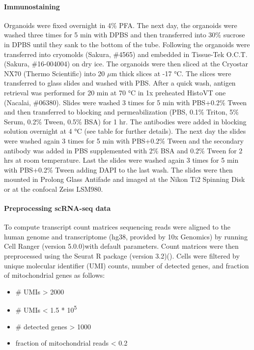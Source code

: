 \paragraph{Immunostaining}
Organoids were fixed overnight in 4\% PFA. The next day, the organoids were washed three times for 5 min with DPBS and then transferred into 30\% sucrose in DPBS until they sank to the bottom of the tube. Following the organoids were transferred into cryomolds (Sakura, \#4565) and embedded in Tissue-Tek O.C.T. (Sakura, \#16-004004) on dry ice. The organoids were then sliced at the Cryostar NX70 (Thermo Scientific) into 20 $\mu$m thick slices at -17 °C. The slices were transferred to glass slides and washed with PBS. After a quick wash, antigen retrieval was performed for 20 min at 70 °C in 1x preheated HistoVT one (Nacalai, \#06380). Slides were washed 3 times for 5 min with PBS+0.2\% Tween and then transferred to blocking and permeabilization (PBS, 0.1\% Triton, 5\% Serum, 0.2\% Tween, 0.5\% BSA) for 1 hr. The antibodies were added in blocking solution overnight at 4 °C (see table for further details). The next day the slides were washed again 3 times for 5 min with PBS+0.2\% Tween and the secondary antibody was added in PBS supplemented with 2\% BSA and 0.2\% Tween for 2 hrs at room temperature. Last the slides were washed again 3 times for 5 min with PBS+0.2\% Tween adding DAPI to the last wash. The slides were then mounted in Prolong Glass Antifade and imaged at the Nikon Ti2 Spinning Disk or at the confocal Zeiss LSM980. 

\paragraph{Preprocessing scRNA-seq data}
To compute transcript count matrices sequencing reads were aligned to the human genome and transcriptome (hg38, provided by 10x Genomics) by running Cell Ranger (version 5.0.0)with default parameters. Count matrices were then preprocessed using the Seurat R package (version 3.2)(\cite{stuart_comprehensive_2019}). Cells were filtered by unique molecular identifier (UMI) counts, number of detected genes, and fraction of mitochondrial genes as follows:

\begin{itemize}
    \item \# UMIs > 2000 
    \item \# UMIs < 1.5 * 10\textsuperscript{5} 
    \item \# detected genes > 1000 
    \item fraction of mitochondrial reads < 0.2
\end{itemize}

